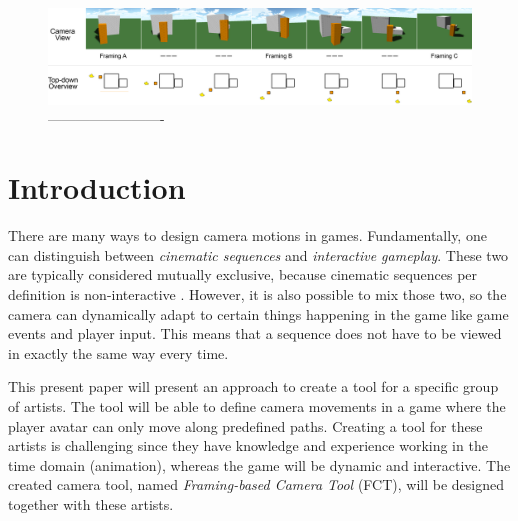 \begin{figure}[htbp]
\centering
\includegraphics[width=1\textwidth]{Pics/Interpolation2}
\caption{-------------------------}
\label{fig:Interpolation}
\end{figure}

\section{Introduction}



There are many ways to design camera motions in games. Fundamentally, one can distinguish between \textit{cinematic sequences} and \textit{interactive gameplay}. These two are typically considered mutually exclusive, because cinematic sequences per definition is non-interactive \cite{haigh-hutchinson_real-time_2009}. However, it is also possible to mix those two, so the camera can dynamically adapt to certain things happening in the game like game events and player input. This means that a sequence does not have to be viewed in exactly the same way every time. 

This present paper will present an approach to create a tool for a specific group of artists. The tool will be able to define camera movements in a game where the player avatar can only move along predefined paths. Creating a tool for these artists is challenging since they have knowledge and experience working in the time domain (animation), whereas the game will be dynamic and interactive. The created camera tool, named \textit{Framing-based Camera Tool} (FCT), will be designed together with these artists.


